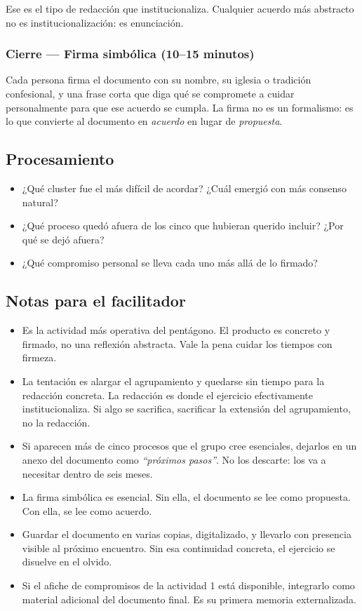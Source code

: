 \documentclass[11pt, a4paper]{article}
\begin{document}
\begin{actividad}
Ese es el tipo de redacción que institucionaliza. Cualquier acuerdo más abstracto no es institucionalización: es enunciación.

\subsubsection*{Cierre --- Firma simbólica (10--15 minutos)}
Cada persona firma el documento con su nombre, su iglesia o tradición confesional, y una frase corta que diga qué se compromete a cuidar personalmente para que ese acuerdo se cumpla. La firma no es un formalismo: es lo que convierte al documento en \emph{acuerdo} en lugar de \emph{propuesta}.

\subsection*{Procesamiento}
\begin{itemize}
  \item ¿Qué cluster fue el más difícil de acordar? ¿Cuál emergió con más consenso natural?
  \item ¿Qué proceso quedó afuera de los cinco que hubieran querido incluir? ¿Por qué se dejó afuera?
  \item ¿Qué compromiso personal se lleva cada uno más allá de lo firmado?
\end{itemize}

\subsection*{Notas para el facilitador}
\begin{itemize}
  \item Es la actividad más operativa del pentágono. El producto es concreto y firmado, no una reflexión abstracta. Vale la pena cuidar los tiempos con firmeza.
  \item La tentación es alargar el agrupamiento y quedarse sin tiempo para la redacción concreta. La redacción es donde el ejercicio efectivamente institucionaliza. Si algo se sacrifica, sacrificar la extensión del agrupamiento, no la redacción.
  \item Si aparecen más de cinco procesos que el grupo cree esenciales, dejarlos en un anexo del documento como \emph{``próximos pasos''}. No los descarte: los va a necesitar dentro de seis meses.
  \item La firma simbólica es esencial. Sin ella, el documento se lee como propuesta. Con ella, se lee como acuerdo.
  \item Guardar el documento en varias copias, digitalizado, y llevarlo con presencia visible al próximo encuentro. Sin esa continuidad concreta, el ejercicio se disuelve en el olvido.
  \item Si el afiche de compromisos de la actividad 1 está disponible, integrarlo como material adicional del documento final. Es su primera memoria externalizada.
\end{itemize}

\end{actividad}
\end{document}
